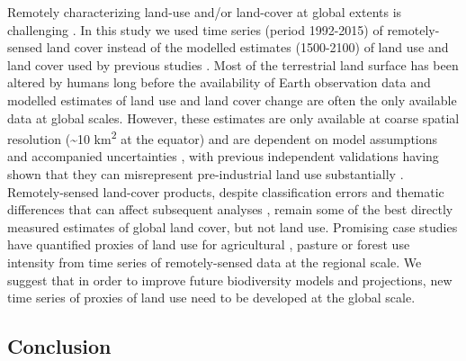 Remotely characterizing land-use and/or land-cover at global extents is challenging \citep{VERBURG2011,Kuemmerle2013}. In this study we used time series (period 1992-2015) of remotely-sensed land cover instead of the modelled estimates (1500-2100) of land use and land cover \citep{Hurtt2011,KleinGoldewijk2016} used by previous studies \citep{Newbold2015,Newbold2016b,DePalma2017}. Most of the terrestrial land surface has been altered by humans long before the availability of Earth observation data \citep{Ellis2010} and modelled estimates of land use and land cover change are often the only available data at global scales. However, these estimates are only available at coarse spatial resolution (\textasciitilde 10 km\textsuperscript{2} at the equator) and are dependent on model assumptions and accompanied uncertainties \citep{Gaillard2010,KleinGoldewijk2013}, with previous independent validations having shown that they can misrepresent pre-industrial land use substantially \citep{Kaplan2017}. Remotely-sensed land-cover products, despite classification errors and thematic differences that can affect subsequent analyses \citep{Sexton2015,Estes2018}, remain some of the best directly measured estimates of global land cover, but not land use. Promising case studies have quantified proxies of land use for agricultural \citep{Estel2015}, pasture \citep{Rufin2015} or forest use intensity \citep{Pflugmacher2012} from time series of remotely-sensed data at the regional scale. We suggest that in order to improve future biodiversity models and projections, new time series of proxies of land use need to be developed at the global scale. 

\subsection{Conclusion}
\label{C04_0403}


